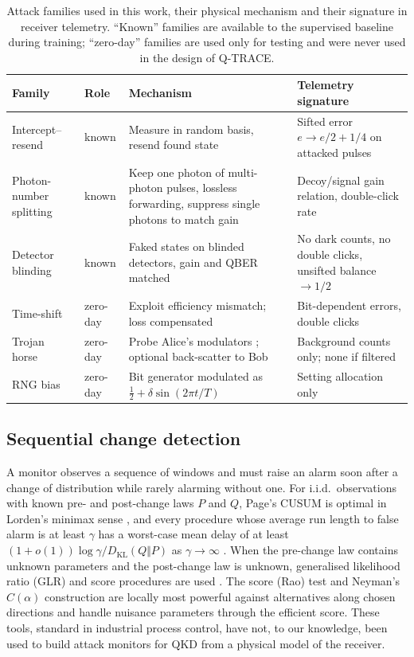 \documentclass[11pt,a4paper]{article}
\theoremstyle{definition}
\theoremstyle{remark}
\newcommand{\KL}{D_{\mathrm{KL}}}
\newcommand{\qtrace}{Q-TRACE}
\begin{document}
\begin{table}[!tbp]
\centering
\caption{Attack families used in this work, their physical mechanism and their signature in receiver telemetry. ``Known'' families are available to the supervised baseline during training; ``zero-day'' families are used only for testing and were never used in the design of \qtrace{}.}
\label{tab:attacks}
\small
\begin{tabular}{@{}>{\raggedright\arraybackslash}p{2.6cm}>{\raggedright\arraybackslash}p{1.35cm}>{\raggedright\arraybackslash}p{5.6cm}>{\raggedright\arraybackslash}p{5.2cm}@{}}
\toprule
Family & Role & Mechanism & Telemetry signature \\
\midrule
Intercept--resend & known & Measure in random basis, resend found state & Sifted error $e\to e/2+1/4$ on attacked pulses \\
Photon-number splitting & known & Keep one photon of multi-photon pulses, lossless forwarding, suppress single photons to match gain \cite{Brassard2000} & Decoy/signal gain relation, double-click rate \\
Detector blinding & known & Faked states on blinded detectors, gain and QBER matched \cite{Lydersen2010} & No dark counts, no double clicks, unsifted balance $\to 1/2$ \\
Time-shift & zero-day & Exploit efficiency mismatch; loss compensated \cite{Qi2007,Zhao2008} & Bit-dependent errors, double clicks \\
Trojan horse & zero-day & Probe Alice's modulators \cite{Gisin2006THA}; optional back-scatter to Bob & Background counts only; none if filtered \\
RNG bias & zero-day & Bit generator modulated as $\tfrac12+\delta\sin(2\pi t/T)$ & Setting allocation only \\
\bottomrule
\end{tabular}
\end{table}

\subsection{Sequential change detection}\label{sec:bg-cd}

A monitor observes a sequence of windows and must raise an alarm soon after a change of distribution while rarely alarming without one. For i.i.d.\ observations with known pre- and post-change laws $P$ and $Q$, Page's CUSUM \cite{Page1954} is optimal in Lorden's minimax sense \cite{Lorden1971,Moustakides1986}, and every procedure whose average run length to false alarm is at least $\gamma$ has a worst-case mean delay of at least $(1+o(1))\log\gamma/\KL(Q\Vert P)$ as $\gamma\to\infty$ \cite{Lorden1971,Lai1998}. When the pre-change law contains unknown parameters and the post-change law is unknown, generalised likelihood ratio (GLR) and score procedures are used \cite{Basseville1993,Tartakovsky2014}. The score (Rao) test \cite{Rao1948} and Neyman's $C(\alpha)$ construction \cite{Neyman1959} are locally most powerful against alternatives along chosen directions and handle nuisance parameters through the efficient score. These tools, standard in industrial process control, have not, to our knowledge, been used to build attack monitors for QKD from a physical model of the receiver.
\end{document}
